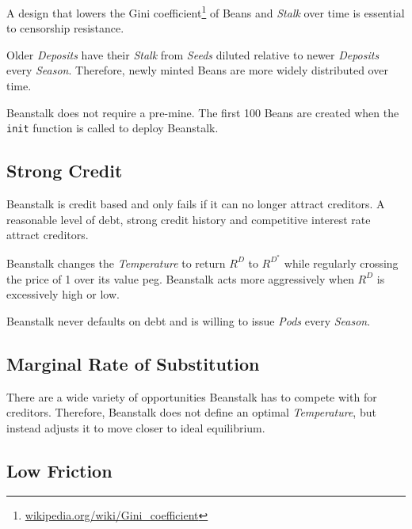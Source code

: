 \documentclass[tikz]{article}
\newcommand{\code}[1]{\texttt{#1}}
\newcommand{\term}[1]{\textsl{#1}}
\newcommand{\fref}[1]{\footnote{\href{http://#1}{#1}}}
\newcommand{\Bean}{} %
\begin{document}
A design that lowers the Gini coefficient\fref{wikipedia.org/wiki/Gini\_coefficient} of Beans and \term{Stalk} over time is essential to censorship resistance.

Older \term{Deposits} have their \term{Stalk} from \term{Seeds} diluted relative to newer \term{Deposits} every \term{Season}. Therefore, newly minted Beans are more widely distributed over time.

Beanstalk does not require a pre-mine. The first 100 Beans are created when the \code{init} function is called to deploy Beanstalk.


\subsection{Strong Credit}

Beanstalk is credit based and only fails if it can no longer attract creditors. A reasonable level of debt, strong credit history and competitive interest rate attract creditors. 

Beanstalk changes the \term{Temperature} to return \hyperlink{ht156}{$R^D$} to $R^{D^*}$ while regularly crossing the price of \Bean1 over its value peg. Beanstalk acts more aggressively when \hyperlink{ht156}{$R^D$} is excessively high or low.

Beanstalk never defaults on debt and is willing to issue \term{Pods} every \term{Season}. 


\subsection{Marginal Rate of Substitution}

There are a wide variety of opportunities Beanstalk has to compete with for creditors. Therefore, Beanstalk does not define an optimal \term{Temperature}, but instead adjusts it to move closer to ideal equilibrium. 


\subsection{Low Friction}
\end{document}

